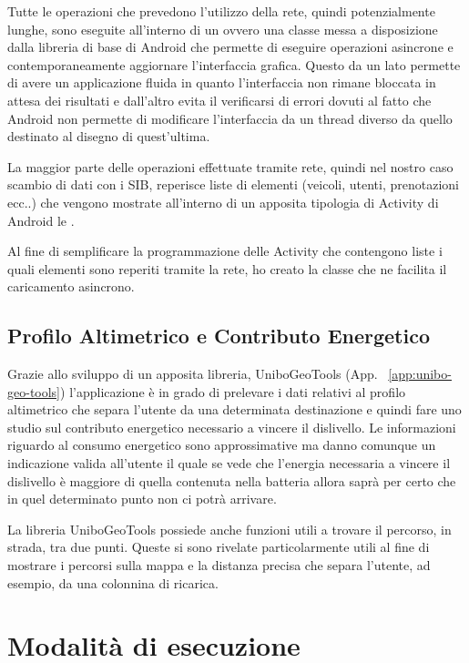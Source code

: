 Tutte le operazioni che prevedono l'utilizzo della rete, quindi potenzialmente lunghe, sono eseguite all'interno di un  ovvero una classe messa a disposizione dalla libreria di base di Android che permette di eseguire operazioni asincrone e contemporaneamente aggiornare l'interfaccia grafica. Questo da un lato permette di avere un applicazione fluida in quanto l'interfaccia non rimane bloccata in attesa dei risultati e dall'altro evita il verificarsi di errori dovuti al fatto che Android non permette di modificare l'interfaccia da un thread diverso da quello destinato al disegno di quest'ultima.

La maggior parte delle operazioni effettuate tramite rete, quindi nel nostro caso scambio di dati con i SIB, reperisce liste di elementi (veicoli, utenti, prenotazioni ecc..) che vengono mostrate all'interno di un apposita tipologia di Activity di Android le .

Al fine di semplificare la programmazione delle Activity che contengono liste i quali elementi sono reperiti tramite la rete, ho creato la classe  che ne facilita il caricamento asincrono.

\subsection{Profilo Altimetrico e Contributo Energetico}

Grazie allo sviluppo di un apposita libreria, UniboGeoTools (App. ~\ref{app:unibo-geo-tools}) l'applicazione è in grado di prelevare i dati relativi al profilo altimetrico che separa l'utente da una determinata destinazione e quindi fare uno studio sul contributo energetico necessario a vincere il dislivello. Le informazioni riguardo al consumo energetico sono approssimative ma danno comunque un indicazione valida all'utente il quale se vede che l'energia necessaria a vincere il dislivello è maggiore di quella contenuta nella batteria allora saprà per certo che in quel determinato punto non ci potrà arrivare.

La libreria UniboGeoTools possiede anche funzioni utili a trovare il percorso, in strada, tra due punti. Queste si sono rivelate particolarmente utili al fine di mostrare i percorsi sulla mappa e la distanza precisa che separa l'utente, ad esempio, da una colonnina di ricarica.


\section{Modalità di esecuzione}

